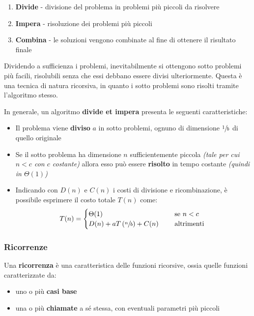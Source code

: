 \documentclass[italian, 10pt]{article}
\begin{document}
\begin{enumerate}
  \item \textbf{Divide} - divisione del problema in problemi più piccoli da risolvere
  \item \textbf{Impera} - risoluzione dei problemi più piccoli
  \item \textbf{Combina} - le soluzioni vengono combinate al fine di ottenere il risultato finale
\end{enumerate}

Dividendo a sufficienza i problemi, inevitabilmente si ottengono sotto problemi più facili, risolubili senza che essi debbano essere divisi ulteriormente.
Questa è una tecnica di natura ricorsiva, in quanto i sotto problemi sono risolti tramite l'algoritmo stesso.

\bigskip
In generale, un algoritmo \textbf{divide et impera} presenta le seguenti caratteristiche:

\begin{itemize}
  \item Il problema viene \textbf{diviso} \(a\) in sotto problemi, ognuno di dimensione \(\sfrac{1}{b}\) di quello originale
  \item Se il sotto problema ha dimensione \(n\) sufficientemente piccola \textit{(tale per cui \(n < c\) con \(c\) costante)} allora esso può essere \textbf{risolto} in tempo costante \textit{(quindi in \(\Theta(1)\))}
  \item Indicando con \(D(n)\) e \(C(n)\) i costi di divisione e ricombinazione, è possibile esprimere il costo totale \(T(n)\) come:
        \[ T(n) = \begin{cases} \Theta(1)                                 & \quad \text{ se } n < c   \\
              D(n) + aT\left(\sfrac{n}{b}\right) + C(n) & \quad \text{ altrimenti }
          \end{cases}\]
\end{itemize}

\subsubsection{Ricorrenze}

Una \textbf{ricorrenza} è una caratteristica delle funzioni ricorsive, ossia quelle funzioni caratterizzate da:

\begin{itemize}
  \item uno o più \textbf{casi base}
  \item una o più \textbf{chiamate} a sé stessa, con eventuali parametri più piccoli
\end{itemize}
\end{document}
